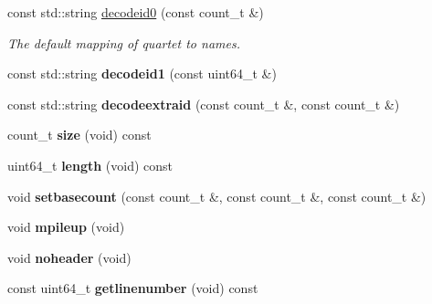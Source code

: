 \begin{DoxyCompactItemize}
\item 
\hypertarget{classprofile_a14e855c712dcd98693968c8f00f76f29}{const std\-::string \hyperlink{classprofile_a14e855c712dcd98693968c8f00f76f29}{decodeid0} (const count\-\_\-t \&)}\label{classprofile_a14e855c712dcd98693968c8f00f76f29}

\begin{DoxyCompactList}\small\item\em The default mapping of quartet to names. \end{DoxyCompactList}\item 
\hypertarget{classprofile_a33c98ef05a11807ed818815fd495193b}{const std\-::string {\bfseries decodeid1} (const uint64\-\_\-t \&)}\label{classprofile_a33c98ef05a11807ed818815fd495193b}

\item 
\hypertarget{classprofile_af40e656795f247c0073e966543a3f296}{const std\-::string {\bfseries decodeextraid} (const count\-\_\-t \&, const count\-\_\-t \&)}\label{classprofile_af40e656795f247c0073e966543a3f296}

\item 
\hypertarget{classprofile_a482d3e2870620c87347c83a6208773f1}{count\-\_\-t {\bfseries size} (void) const }\label{classprofile_a482d3e2870620c87347c83a6208773f1}

\item 
\hypertarget{classprofile_ab949c665beb14259f8e44cbde6f54eb8}{uint64\-\_\-t {\bfseries length} (void) const }\label{classprofile_ab949c665beb14259f8e44cbde6f54eb8}

\item 
\hypertarget{classprofile_aa5b384afbc0fc9d014b4b489928ef6e7}{void {\bfseries setbasecount} (const count\-\_\-t \&, const count\-\_\-t \&, const count\-\_\-t \&)}\label{classprofile_aa5b384afbc0fc9d014b4b489928ef6e7}

\item 
\hypertarget{classprofile_a7866bf2ce66d55e69043d04e3105df18}{void {\bfseries mpileup} (void)}\label{classprofile_a7866bf2ce66d55e69043d04e3105df18}

\item 
\hypertarget{classprofile_a0182200bc301248ace0423774d81e41f}{void {\bfseries noheader} (void)}\label{classprofile_a0182200bc301248ace0423774d81e41f}

\item 
\hypertarget{classprofile_af4a0d1674173165c0cd9f1d44e89b5fa}{const uint64\-\_\-t {\bfseries getlinenumber} (void) const }\label{classprofile_af4a0d1674173165c0cd9f1d44e89b5fa}


\end{DoxyCompactItemize}
